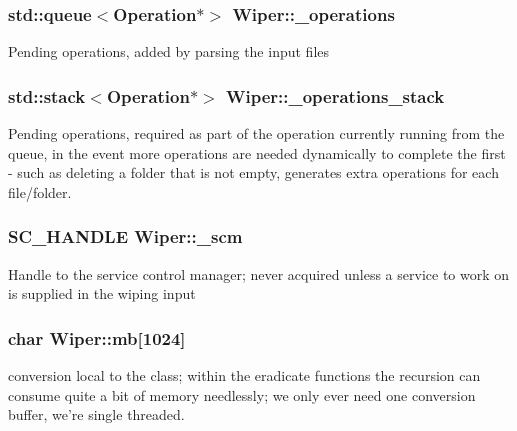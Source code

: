 \subsubsection[{\-\_\-operations}]{\setlength{\rightskip}{0pt plus 5cm}std\-::queue$<${\bf Operation}$\ast$$>$ Wiper\-::\-\_\-operations\hspace{0.3cm}{\ttfamily [private]}}\label{class_wiper_a2ac92738b2626a47eecff22843e1ccd3}
Pending operations, added by parsing the input files 
\subsubsection[{\-\_\-operations\-\_\-stack}]{\setlength{\rightskip}{0pt plus 5cm}std\-::stack$<${\bf Operation}$\ast$$>$ Wiper\-::\-\_\-operations\-\_\-stack\hspace{0.3cm}{\ttfamily [private]}}\label{class_wiper_a98e266ae56c41c58c0d21ce30064d684}
Pending operations, required as part of the operation currently running from the queue, in the event more operations are needed dynamically to complete the first -\/ such as deleting a folder that is not empty, generates extra operations for each file/folder. 
\subsubsection[{\-\_\-scm}]{\setlength{\rightskip}{0pt plus 5cm}S\-C\-\_\-\-H\-A\-N\-D\-L\-E Wiper\-::\-\_\-scm\hspace{0.3cm}{\ttfamily [private]}}\label{class_wiper_aa14de868e468e980872140bd970eb3e5}
Handle to the service control manager; never acquired unless a service to work on is supplied in the wiping input 
\subsubsection[{mb}]{\setlength{\rightskip}{0pt plus 5cm}char Wiper\-::mb\mbox{[}1024\mbox{]}\hspace{0.3cm}{\ttfamily [private]}}\label{class_wiper_a112d278ddc1fdca0a552bab45568a965}
conversion local to the class; within the eradicate functions the recursion can consume quite a bit of memory needlessly; we only ever need one conversion buffer, we're single threaded. 